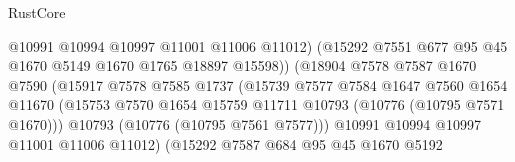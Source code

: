 \begin{lexlean}{RustCore}
\begin{coremodule}
                                        @10991
                                        @10994
                                        @10997
                                        @11001
                                        @11006
                                        @11012)
                                      (@15292
                                        @7551
                                        @677
                                        @95
                                        @45
                                        @1670
                                        @5149
                                        @1670
                                        @1765
                                        @18897
                                        @15598))
                                    (@18904
                                      @7578
                                      @7587
                                      @1670
                                      @7590
                                      (@15917
                                        @7578
                                        @7585
                                        @1737
                                        (@15739
                                          @7577
                                          @7584
                                          @1647
                                          @7560
                                          @1654
                                          @11670
                                          (@15753
                                            @7570
                                            @1654
                                            @15759
                                            @11711
                                            @10793
                                            (@10776 (@10795 @7571 @1670)))
                                          @10793
                                          (@10776 (@10795 @7561 @7577)))
                                        @10991
                                        @10994
                                        @10997
                                        @11001
                                        @11006
                                        @11012)
                                      (@15292
                                        @7587
                                        @684
                                        @95
                                        @45
                                        @1670
                                        @5192

\end{coremodule}
\end{lexlean}
